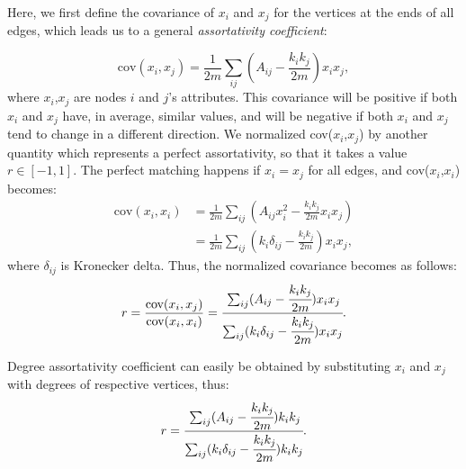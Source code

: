	Here, we first define the covariance of $x_i$ and $x_j$ for the vertices at the ends of all edges, which leads us to a general \textit{assortativity coefficient}:
	
	\begin{equation}
		\text{cov}(x_i, x_j) = \frac{1}{2m}\sum_{ij}(A_{ij} - \frac{k_i k_j}{2m})x_i x_j,				
	\end{equation}
where $x_i$,$x_j$ are nodes $i$ and $j$'s attributes. This covariance will be positive if both $x_i$ and $x_j$ have, in average, similar values, and will be negative if both $x_i$ and $x_j$ tend to change in a different direction. We normalized cov($x_i$,$x_j$) by another quantity which represents a perfect assortativity, so that it takes a value $r \in [-1 ,1]$. The perfect matching happens if $x_i = x_j$ for all edges, and cov($x_i$,$x_i$) becomes:
	\begin{equation}
	\begin{split}
	 \text{cov}(x_i, x_i) &=  \frac{1}{2m}\sum_{ij}(A_{ij} x_i^2 - \frac{k_i k_j}{2m} x_i x_j) \\
	 		             &=  \frac{1}{2m}\sum_{ij}(k_i \delta_{ij} - \frac{k_i k_j}{2m}) x_i x_j,
	\end{split}
	\end{equation}
	where $\delta_{ij}$ is Kronecker delta.
Thus, the normalized covariance becomes as follows:
	\begin{equation}
	\begin{split}
	 r = \frac{ \text{cov}(x_i, x_j)}{ \text{cov}(x_i, x_i)} = 
	 \cfrac{\sum_{ij}(A_{ij} - \cfrac{k_i k_j}{2m})x_i x_j}{\sum_{ij}(k_i \delta_{ij} - \cfrac{k_i k_j}{2m}) x_i x_j}.
	\end{split}
	\end{equation}

Degree assortativity coefficient can easily be obtained by substituting $x_i$ and $x_j$ with degrees of respective vertices, thus:
	\begin{equation}
	 r =  \cfrac{\sum_{ij}(A_{ij} - \cfrac{k_i k_j}{2m})k_i k_j}{\sum_{ij}(k_i \delta_{ij} - \cfrac{k_i k_j}{2m}) k_i k_j}.
	\end{equation}

